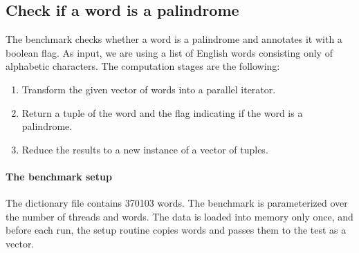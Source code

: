 \subsection{Check if a word is a palindrome}
The benchmark checks whether a word is a palindrome and annotates it with a boolean flag. As input, we are using a list of English words consisting only of alphabetic characters. The computation stages are the following:

\begin{enumerate}
    \item Transform the given vector of words into a parallel iterator.
    \item Return a tuple of the word and the flag indicating if the word is a palindrome.
    \item Reduce the results to a new instance of a vector of tuples.
\end{enumerate}

\paragraph{The benchmark setup}
The dictionary file contains 370103 words. The benchmark is parameterized over the number of threads and words. The data is loaded into memory only once, and before each run, the setup routine copies \n{} words and passes them to the test as a vector.

